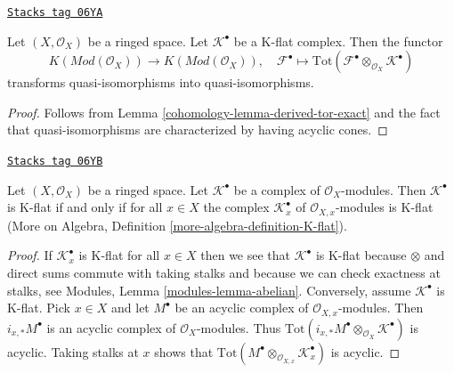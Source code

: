 \begin{lemma}
\label{cohomology-lemma-K-flat-quasi-isomorphism}
\href{https://stacks.math.columbia.edu/tag/06YA}{\texttt{Stacks tag 06YA}}

Let $(X, \mathcal{O}_X)$ be a ringed space.
Let $\mathcal{K}^\bullet$ be a K-flat complex.
Then the functor
$$
K(\textit{Mod}(\mathcal{O}_X))
\longrightarrow
K(\textit{Mod}(\mathcal{O}_X)), \quad
\mathcal{F}^\bullet
\longmapsto
\text{Tot}(\mathcal{F}^\bullet \otimes_{\mathcal{O}_X} \mathcal{K}^\bullet)
$$
transforms quasi-isomorphisms into quasi-isomorphisms.
\end{lemma}

\begin{proof}

Follows from
Lemma \ref{cohomology-lemma-derived-tor-exact}
and the fact that quasi-isomorphisms are characterized by having
acyclic cones.
\end{proof}

\begin{lemma}
\label{cohomology-lemma-check-K-flat-stalks}
\href{https://stacks.math.columbia.edu/tag/06YB}{\texttt{Stacks tag 06YB}}

Let $(X, \mathcal{O}_X)$ be a ringed space. Let $\mathcal{K}^\bullet$
be a complex of $\mathcal{O}_X$-modules. Then $\mathcal{K}^\bullet$
is K-flat if and only if for all $x \in X$ the complex
$\mathcal{K}_x^\bullet$ of $\mathcal{O}_{X, x}$-modules is K-flat
(More on Algebra, Definition \ref{more-algebra-definition-K-flat}).
\end{lemma}

\begin{proof}
If $\mathcal{K}_x^\bullet$ is K-flat for all $x \in X$ then we see
that $\mathcal{K}^\bullet$ is K-flat because $\otimes$ and
direct sums commute with taking stalks and because we can check exactness
at stalks, see
Modules, Lemma \ref{modules-lemma-abelian}.
Conversely, assume $\mathcal{K}^\bullet$ is K-flat. Pick $x \in X$
and let
$M^\bullet$ be an acyclic complex of $\mathcal{O}_{X, x}$-modules.
Then $i_{x, *}M^\bullet$ is an acyclic complex of $\mathcal{O}_X$-modules.
Thus $\text{Tot}(i_{x, *}M^\bullet \otimes_{\mathcal{O}_X} \mathcal{K}^\bullet)$
is acyclic. Taking stalks at $x$ shows that
$\text{Tot}(M^\bullet \otimes_{\mathcal{O}_{X, x}} \mathcal{K}_x^\bullet)$
is acyclic.
\end{proof}

